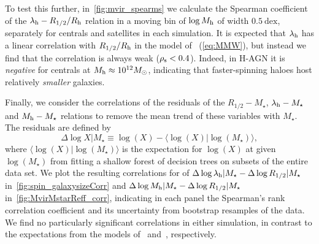 \documentclass[usenatbib,useAMS]{mnras}
\newcommand{\hd}[1]{\textcolor{purple}{[{\bf HD says}: #1]}}
\begin{document}
To test this further, in~\cref{fig:mvir_spearms} we calculate the Spearman coefficient of the $\lambda_{\rm h}-R_{1/2}/R_{\rm h}$ relation in a moving bin of $\log M_{\rm h}$ of width $0.5~\mathrm{dex}$, separately for centrals and satellites in each simulation. It is expected that $\lambda_{\rm h}$ has a linear correlation with $R_{1/2}/R_{\rm h}$ in the model of~\citeauthor{MMW_1998} (\cref{eq:MMW}), but instead we find that the correlation is always weak ($\rho_{\rm s} < 0.4$). Indeed, in H-AGN it is \emph{negative} for centrals at $M_{\rm h} \approx 10^{12} M_\odot$, indicating that faster-spinning haloes host relatively \emph{smaller} galaxies.

Finally, we consider the correlations of the residuals of the $R_{1/2} - M_\star$, $\lambda_{\rm h} - M_\star$ and $M_{\rm h} - M_\star$ relations to remove the mean trend of these variables with $M_\star$. The residuals are defined by
% 
\begin{equation}
    \Delta \log X|M_\star
    \equiv
    \log(X) - \langle \log(X)|\log(M_\star) \rangle,    
\end{equation}
% 
where $\langle \log(X)|\log(M_\star) \rangle$ is the expectation for $\log(X)$ at given $\log(M_\star)$ from fitting a shallow forest of decision trees on subsets of the entire data set.
We plot the resulting correlations for of $\Delta \log \lambda_{\rm h}|M_\star - \Delta \log R_{1/2}|M_\star$ in~\cref{fig:spin_galaxysizeCorr} and $\Delta \log M_{\rm h}|M_\star - \Delta \log R_{1/2}|M_\star$ in~\cref{fig:MvirMstarReff_corr}, indicating in each panel the Spearman's rank correlation coefficient and its uncertainty from bootstrap resamples of the data. We find no particularly significant correlations in either simulation, in contrast to the expectations from the models of~\citeauthor{MMW_1998} and~\citeauthor{Kravtsov_2013}, respectively.


\end{document}
